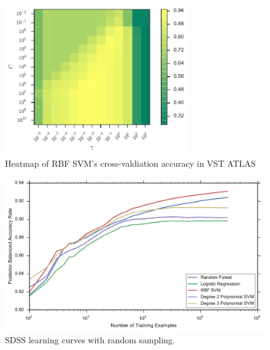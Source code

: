 \begin{figure}[p]
	\centering
	\includegraphics[width=0.7\textwidth]{figures/4_expt1/vstatlas_grid_rbf}
	\caption[Heatmap of RBF SVM's cross-valdiation accuracy in VST ATLAS]{
		Heatmap of RBF SVM's cross-valdiation accuracy in VST ATLAS}
	\label{fig:vstatlas_grid_rbf}
\end{figure}





\begin{figure}[p]
	\centering
	\includegraphics[width=\textwidth]{figures/4_expt1/sdss_learning_curves}
	\caption[Learning curves with random sampling in SDSS]{
		SDSS learning curves with random sampling.}
	\label{fig:sdss_learning_curves}
\end{figure}

